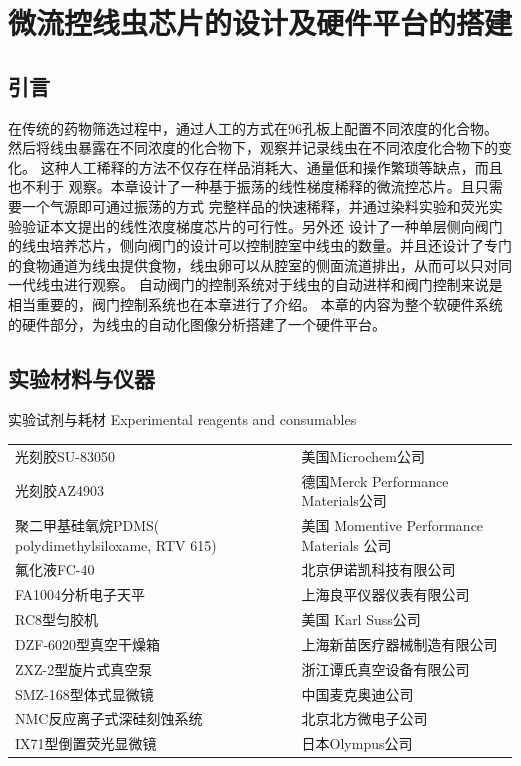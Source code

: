 \chapter{微流控线虫芯片的设计及硬件平台的搭建}
\section{引言}
	在传统的药物筛选过程中，通过人工的方式在96孔板上配置不同浓度的化合物。
	然后将线虫暴露在不同浓度的化合物下，观察并记录线虫在不同浓度化合物下的变化。
	这种人工稀释的方法不仅存在样品消耗大、通量低和操作繁琐等缺点，而且也不利于
	观察。本章设计了一种基于振荡的线性梯度稀释的微流控芯片。且只需要一个气源即可通过振荡的方式
	完整样品的快速稀释，并通过染料实验和荧光实验验证本文提出的线性浓度梯度芯片的可行性。另外还
	设计了一种单层侧向阀门的线虫培养芯片，侧向阀门的设计可以控制腔室中线虫的数量。并且还设计了专门
	的食物通道为线虫提供食物，线虫卵可以从腔室的侧面流道排出，从而可以只对同一代线虫进行观察。
	自动阀门的控制系统对于线虫的自动进样和阀门控制来说是相当重要的，阀门控制系统也在本章进行了介绍。
	本章的内容为整个软硬件系统的硬件部分，为线虫的自动化图像分析搭建了一个硬件平台。
\section{实验材料与仪器}
	\begin{table}[htbp]
	\centering
	\bicaption
    {实验试剂与耗材}
    {Experimental reagents and consumables}
	\begin{tabular}{p{150pt}p{230pt}}
	\toprule
		光刻胶SU-83050 & 美国Microchem公司\\
		光刻胶AZ4903 & 德国Merck Performance Materials公司\\
		聚二甲基硅氧烷PDMS( polydimethylsiloxame, RTV 615) &美国 Momentive Performance Materials 公司\\
		氟化液FC-40 & 北京伊诺凯科技有限公司\\
		FA1004分析电子天平 & 上海良平仪器仪表有限公司\\
		RC8型匀胶机 & 美国 Karl Suss公司\\
		DZF-6020型真空干燥箱& 上海新苗医疗器械制造有限公司\\
		ZXZ-2型旋片式真空泵 & 浙江谭氏真空设备有限公司\\
		SMZ-168型体式显微镜& 中国麦克奥迪公司 \\
		NMC反应离子式深硅刻蚀系统 & 北京北方微电子公司\\
		IX71型倒置荧光显微镜 & 日本Olympus公司\\
	\bottomrule
	\end{tabular}
	\end{table}	
